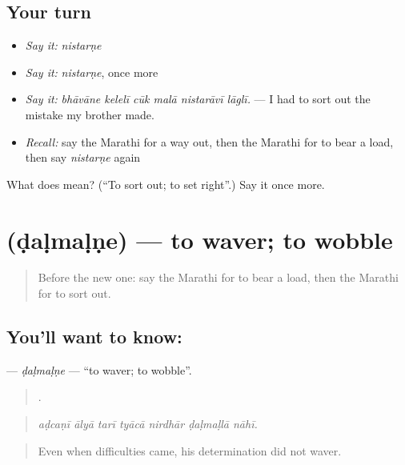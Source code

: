 \subsection*{Your turn}
\begin{itemize}
\raggedright
  \item \emph{Say it:} \emph{nistarṇe}
  \item \emph{Say it:} \emph{nistarṇe}, once more
  \item \emph{Say it:} \emph{bhāvāne kelelī cūk malā nistarāvī lāglī.} — I had to sort out the mistake my brother made.
  \item \emph{Recall:} say the Marathi for a way out, then the Marathi for to bear a load, then say \emph{nistarṇe} again
\end{itemize}

\begin{tcolorbox}[breakable,colback=teal!4,colframe=teal!35!black,title={Before you move on}]
What does  mean? (\textquotedblleft{}To sort out; to set right\textquotedblright{}.) Say it once more.
\end{tcolorbox}
\section[\texorpdfstring{\mr{डळमळणे} (ḍaḷmaḷṇe)}{डळमळणे (ḍaḷmaḷṇe)}]{ (ḍaḷmaḷṇe) — to waver; to wobble}

\label{lesson:MR-C548-dalmalne}



\begin{quote}
Before the new one: say the Marathi for to bear a load, then the Marathi for to sort out.
\end{quote}

\subsection*{You'll want to know: }
\textbf{} — \emph{ḍaḷmaḷṇe} — \textquotedblleft{}to waver; to wobble\textquotedblright{}.

\begin{quote}
      .
\end{quote}

\begin{quote}
\emph{aḍcaṇī ālyā tarī tyācā nirdhār ḍaḷmaḷlā nāhī.}
\end{quote}

\begin{quote}
Even when difficulties came, his determination did not waver.
\end{quote}

